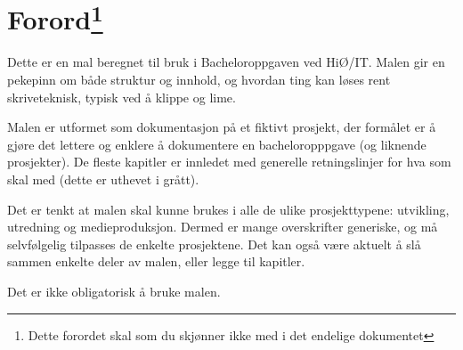 \cleardoublepage

 \setcounter{page}{-1}
\chapter*{Forord\footnote{Dette forordet skal som du skjønner ikke med i det endelige dokumentet \smiley}}

Dette er en mal beregnet til bruk i Bacheloroppgaven ved HiØ/IT. Malen gir en pekepinn om både struktur og innhold, og hvordan ting kan løses rent skriveteknisk, typisk ved å klippe og lime.

Malen er utformet som dokumentasjon på et fiktivt prosjekt, der formålet er å gjøre det lettere og enklere å dokumentere en bacheloropppgave (og liknende prosjekter). De fleste kapitler er innledet med generelle retningslinjer for hva som skal med (dette er uthevet i grått).

Det er tenkt at malen skal kunne brukes i alle de ulike prosjekttypene: utvikling, utredning og medieproduksjon. Dermed er mange overskrifter generiske, og må selvfølgelig tilpasses de enkelte prosjektene. Det kan også være aktuelt å slå sammen enkelte deler av malen, eller legge til kapitler.

Det er ikke obligatorisk å bruke malen.
